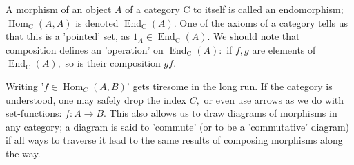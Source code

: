 \documentclass[12pt]{book}
\theoremstyle{definition}\newtheorem{dfn}{Définition}[chapter]
\theoremstyle{plain}\newtheorem{thm}{Théorème}[chapter]
\theoremstyle{plain}\newtheorem{prp}{Proposition}[chapter]
\theoremstyle{plain}\newtheorem{lem}{\bf Lemme}[chapter]
\theoremstyle{plain}\newtheorem{axm}{\bf Axiome}[chapter]
\theoremstyle{plain}\newtheorem{lmm}{\bf Lemme}[chapter]
\theoremstyle{plain}\newtheorem{exm}{\bf Example}[chapter]
\theoremstyle{plain}\newtheorem{cor}{\bf Corollaire}[chapter]
\theoremstyle{remark}\newtheorem{rem}{Remarque}[chapter]
\begin{document}
A morphism of an object $A$ of a category $\mathrm{C}$ to itself is called an endomorphism; $\operatorname{Hom}_{\mathrm{C}}(A, A)$ is denoted $\operatorname{End}_{\mathrm{C}}(A) .$ One of the axioms of a category tells us that this is a 'pointed' set, as $1_{A} \in \operatorname{End}_{\mathrm{C}}(A)$. We should note that composition defines an 'operation' on $\operatorname{End}_{\mathrm{C}}(A):$ if $f, g$ are elements of $\operatorname{End}_{\mathrm{C}}(A),$ so is their composition $g f$.

Writing '$f \in \operatorname{Hom}_{C}(A, B)$' gets tiresome in the long run. If the category is understood, one may safely drop the index $C,$ or even use arrows as we do with set-functions: $f: A \rightarrow B$. This also allows us to draw diagrams of morphisms in any category; a diagram is said to 'commute' (or to be a 'commutative' diagram) if all ways to traverse it lead to the same results of composing morphisms along the way.
\end{document}
